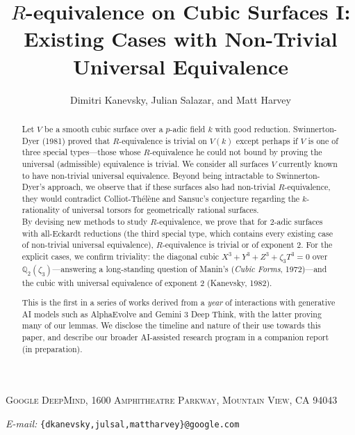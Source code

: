 \documentclass[11pt]{article}
\title{$R$-equivalence on Cubic Surfaces I:\\
Existing Cases with Non-Trivial Universal Equivalence}
\author{Dimitri Kanevsky, Julian Salazar, and Matt Harvey}
\date{}
\theoremstyle{definition}
\begin{document}
\newcommand{\Addresses}{{%
  \footnotesize
  \textsc{Google DeepMind, 1600 Amphitheatre Parkway, Mountain View, CA 94043}\par\nopagebreak
  \textit{E-mail:} \texttt{\{dkanevsky,julsal,mattharvey\}@google.com}
  \bigskip
}}
\maketitle
\begin{ai}
\Addresses
\end{ai}

\begin{abstract}
\footnotesize
Let $V$ be a smooth cubic surface over a $p$-adic field $k$ with good reduction. Swinnerton-Dyer (1981) proved that $R$-equivalence is trivial on $V(k)$ except perhaps if $V$ is one of three special types---those whose $R$-equivalence he could not bound by proving the universal (admissible) equivalence is trivial. We consider all surfaces $V$ currently known to have non-trivial universal equivalence.  Beyond being intractable to Swinnerton-Dyer's approach, we observe that if these surfaces also had non-trivial $R$-equivalence, they would contradict Colliot-Thélène and Sansuc's conjecture regarding the $k$-rationality of universal torsors for geometrically rational surfaces.\\
\indent By devising new methods to study $R$-equivalence, we prove that for 2-adic surfaces with all-Eckardt reductions (the third special type, which contains every existing case of non-trivial universal equivalence), $R$-equivalence is trivial or of exponent 2. For the explicit cases, we confirm triviality: the diagonal cubic $X^3+Y^3+Z^3+\zeta_3 T^3=0$ over $\mathbb{Q}_2(\zeta_3)$---answering
a long-standing question of Manin's (\textit{Cubic Forms}, 1972)---and the cubic with universal equivalence of exponent 2 (Kanevsky, 1982).\\
\begin{ai}
\indent This is the first in a series of works derived from a \textit{year} of interactions with generative AI models such as AlphaEvolve and Gemini 3 Deep Think, with the latter proving many of our lemmas. We disclose the timeline and nature of their use towards this paper, and describe our broader AI-assisted research program in a companion report (in preparation).
\end{ai}
\end{abstract}

\end{document}
